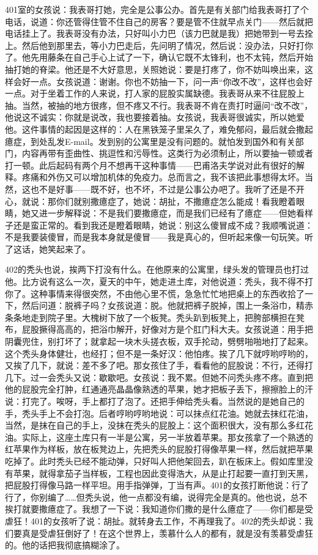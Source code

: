 401室的女孩说：我表哥打她，完全是公事公办。首先是有关部门给我表哥打了个电话，说道：你还管得住管不住自己的房客？要是管不住就早点关门——然后就把电话挂上了。我表哥没有办法，只好叫小力巴（该力巴就是我）把她带到一号去拴上。然后他到那里去，等小力巴走后，先问明了情况，然后说：没办法，只好打你了。他先用藤条在自己手心上试了一下，确认它既不太锋利，也不太钝，然后开始抽打她的脊梁。他还是不大好意思，关照她说：要是打疼了，你不妨叫唤出来，这样会好一点。女孩说道：谢谢。你也不妨抽一下，问一声“你改不改”，这样也会好一点。对于坐着工作的人来说，打人家的屁股实属缺德。我表哥从来不往屁股上抽。当然，被抽的地方很疼，但不疼又不行。我表哥不肯在责打时逼问“改不改”，他说这不诚实：你就是说改，我也要接着抽。女孩说，我表哥很诚实，所以她爱他。这件事情的起因是这样的：人在黑铁笼子里呆久了，难免郁闷，最后就会撒起癔症，到处乱发E-mail。发到别的公寓里是没有问题的。就怕发到国外和有关部门，内容再带有歪曲性、挑逗性和污辱性。这类行为必须制止，所以要抽一顿或者打一顿。此后起码有两个月不想再干这种事情——巴甫洛夫学说对此有很好的解释。疼痛和外伤又可以增加机体的免疫力。总而言之，我不该把此事想得太坏。当然，这也不是好事——既不好，也不坏，不过是公事公办吧了。我听了还是不开心，就说：那你们就别撒癔症了，她说：胡扯，不撒癔症怎么能成！看我瞪着眼睛，她又进一步解释说：不是我们要撒癔症，而是我们已经有了癔症——但她看样子还是蛮正常的。看到我还是瞪着眼睛，她说：别这么傻冒成不成？我顺嘴说道：不是我要装傻冒，而是我本身就是傻冒——我是真心的，但听起来像一句玩笑。听了这话，她笑起来了。 

402的秃头也说，挨两下打没有什么。在他原来的公寓里，绿头发的管理员也打过他。比方说有这么一次，夏天的中午，她走进土库，对他说道：秃头，我不得不打你了。这种事情来得很突然，不由他心里不慌，急急忙忙地把桌上的东西收拾了一下，然后问道：脱裤子吗？女孩说道：脱。他就把裤子脱掉，围上一条浴巾，精赤条条地走到院子里。大槐树下放了一个板凳。秃头趴到板凳上，把胯部横担在凳布，屁股撅得高高的，把浴巾解开，好像对方是个肛门科大夫。女孩说道：用手把阴囊兜住，别打坏了；就拿起一块木头搓衣板，双手抡动，劈劈啪啪地打了起来。这个秃头身体健壮，也经打；但不是一条好汉：他怕疼。挨了几下就哼哟哼哟的，又挨了几下，就说：差不多了吧。那女孩住了手，看看他的屁股说：不行，还得打几下。过一会秃头又说：歇歇吧。女孩说：我不累。但她不问秃头疼不疼。直到把他的屁股完全打肿，红通通亮晶晶像熟透的苹果，她才把板子丢下，擦擦脸上的汗说：打完了。唉呀，手上都打了泡了。还把手伸给秃头看。当然说的是她自己的手，秃头手上不会打泡。后者哼哟哼哟地说：可以抹点红花油。她就去抹红花油，当然，是抹在自己的手上，没抹在秃头的屁股上：这个面积很大，没有那么多红花油。实际上，这座土库只有一半是公寓，另一半放着苹果。那女孩拿了一个熟透的红苹果作为样板，放在板凳边上，先把秃头的屁股打得像苹果一样，然后就把苹果吃掉了。此时秃头已经不能动弹，只好叫人把他架回去，趴在板床上。假如库里没有苹果，就得拿茄子当样板，工程也因此变得浩大，从是止打起要一直打到天黑，把屁股打得像马路一样平坦。用手指弹弹，丁当有声。401的女孩打断他说：行了行了，你别编了……但秃头说，他一点都没有编，说得完全是真的。他也说，总不挨打就要撒癔症了。我想了一下说：我知道你们撒的是什么癔症了——你们都是受虐狂！401的女孩听了说：胡扯。就转身去工作，不再理我了。402的秃头却说：我们要真是受虐狂倒好了！在这个世界上，羡慕什么人的都有，就是没有羡慕受虐狂的。他的话把我彻底搞糊涂了。 



